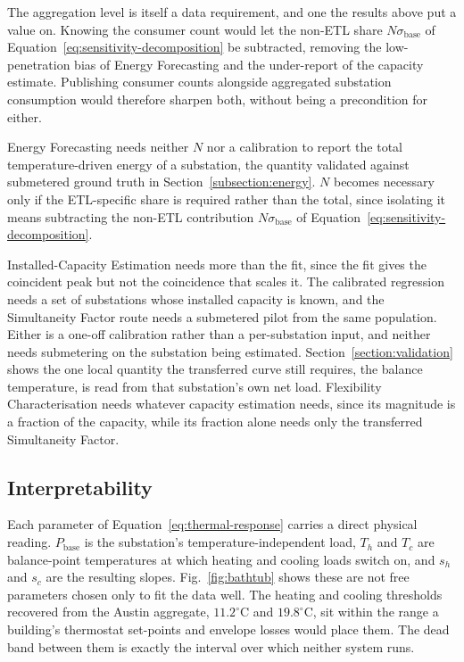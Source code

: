 \documentclass[9pt,journal,a4]{IEEEtran}
\begin{document}
The aggregation level is itself a data requirement, and one the results above put a value on. Knowing the consumer count would let the non-ETL share $N \sigma_{\mathrm{base}}$ of Equation~\eqref{eq:sensitivity-decomposition} be subtracted, removing the low-penetration bias of Energy Forecasting and the under-report of the capacity estimate. Publishing consumer counts alongside aggregated substation consumption would therefore sharpen both, without being a precondition for either.

Energy Forecasting needs neither $N$ nor a calibration to report the total temperature-driven energy of a substation, the quantity validated against submetered ground truth in Section~\ref{subsection:energy}. $N$ becomes necessary only if the ETL-specific share is required rather than the total, since isolating it means subtracting the non-ETL contribution $N \sigma_{\mathrm{base}}$ of Equation~\eqref{eq:sensitivity-decomposition}.

Installed-Capacity Estimation needs more than the fit, since the fit gives the coincident peak but not the coincidence that scales it. The calibrated regression needs a set of substations whose installed capacity is known, and the Simultaneity Factor route needs a submetered pilot from the same population. Either is a one-off calibration rather than a per-substation input, and neither needs submetering on the substation being estimated. Section~\ref{section:validation} shows the one local quantity the transferred curve still requires, the balance temperature, is read from that substation's own net load. Flexibility Characterisation needs whatever capacity estimation needs, since its magnitude is a fraction of the capacity, while its fraction alone needs only the transferred Simultaneity Factor.


\subsection{Interpretability}
\label{subsection:interpretability}

Each parameter of Equation~\eqref{eq:thermal-response} carries a direct physical reading. $P_{\mathrm{base}}$ is the substation's temperature-independent load, $T_h$ and $T_c$ are balance-point temperatures at which heating and cooling loads switch on, and $s_h$ and $s_c$ are the resulting slopes. Fig.~\ref{fig:bathtub} shows these are not free parameters chosen only to fit the data well. The heating and cooling thresholds recovered from the Austin aggregate, $11.2^\circ$C and $19.8^\circ$C, sit within the range a building's thermostat set-points and envelope losses would place them. The dead band between them is exactly the interval over which neither system runs.
\end{document}
